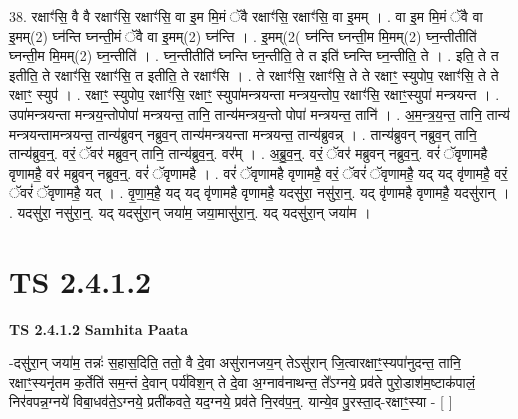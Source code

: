 \documentclass[17pt]{extarticle}
\begin{document}
38. रक्षाꣳ॑सि॒ वै वै रक्षाꣳ॑सि॒ रक्षाꣳ॑सि॒ वा इ॒म मि॒मं ॅवै रक्षाꣳ॑सि॒ रक्षाꣳ॑सि॒ वा इ॒मम् । . वा इ॒म मि॒मं ॅवै वा इ॒मम्(2) घ्न॑न्ति घ्नन्ती॒मं ॅवै वा इ॒मम्(2) घ्न॑न्ति । . इ॒मम्(2( घ्न॑न्ति घ्नन्ती॒म मि॒मम्(2) घ्न॒न्तीतीति॑ घ्नन्ती॒म मि॒मम्(2) घ्न॒न्तीति॑ । . घ्न॒न्तीतीति॑ घ्नन्ति घ्न॒न्तीति॒ ते त इति॑ घ्नन्ति घ्न॒न्तीति॒ ते । . इति॒ ते त इतीति॒ ते रक्षाꣳ॑सि॒ रक्षाꣳ॑सि॒ त इतीति॒ ते रक्षाꣳ॑सि । . ते रक्षाꣳ॑सि॒ रक्षाꣳ॑सि॒ ते ते रक्षाꣳ॒॒ स्युपोप॒ रक्षाꣳ॑सि॒ ते ते रक्षाꣳ॒॒ स्युप॑ । . रक्षाꣳ॒॒ स्युपोप॒ रक्षाꣳ॑सि॒ रक्षाꣳ॒॒ स्युपा॑मन्त्रयन्ता मन्त्रय॒न्तोप॒ रक्षाꣳ॑सि॒ रक्षाꣳ॒॒स्युपा॑ मन्त्रयन्त । . उपा॑मन्त्रयन्ता मन्त्रय॒न्तोपोपा॑ मन्त्रयन्त॒ तानि॒ तान्य॑मन्त्रय॒न्तो पोपा॑ मन्त्रयन्त॒ तानि॑ । . अ॒म॒न्त्र॒य॒न्त॒ तानि॒ तान्य॑ मन्त्रयन्तामन्त्रयन्त॒ तान्य॑ब्रुवन् नब्रुव॒न् तान्य॑मन्त्रयन्ता मन्त्रयन्त॒ तान्य॑ब्रुवन्न् । . तान्य॑ब्रुवन् नब्रुव॒न् तानि॒ तान्य॑ब्रुव॒न्॒. वरं॒ ॅवर॑ मब्रुव॒न् तानि॒ तान्य॑ब्रुव॒न्॒. वर᳚म् । . अ॒ब्रु॒व॒न्॒. वरं॒ ॅवर॑ मब्रुवन् नब्रुव॒न्॒. वरं॑ ॅवृणामहै वृणामहै॒ वर॑ मब्रुवन् नब्रुव॒न्॒. वरं॑ ॅवृणामहै । . वरं॑ ॅवृणामहै वृणामहै॒ वरं॒ ॅवरं॑ ॅवृणामहै॒ यद् यद् वृ॑णामहै॒ वरं॒ ॅवरं॑ ॅवृणामहै॒ यत् । . वृ॒णा॒म॒है॒ यद् यद् वृ॑णामहै वृणामहै॒ यदसु॑रा॒ नसु॑रा॒न्॒. यद् वृ॑णामहै वृणामहै॒ यदसु॑रान् । . यदसु॑रा॒ नसु॑रा॒न्॒. यद् यदसु॑रा॒न् जया॑म॒ जया॒मासु॑रा॒न्॒. यद् यदसु॑रा॒न् जया॑म । \newline
\pagebreak
{}

\section{ TS 2.4.1.2 }

\textbf{TS 2.4.1.2 } \newline
\textbf{Samhita Paata} \newline

-दसु॑रा॒न् जया॑म॒ तन्नः॑ स॒हास॒दिति॒ ततो॒ वै दे॒वा असु॑रानजय॒न् तेऽसु॑रान् जि॒त्वारक्षाꣳ॒॒स्यपा॑नुदन्त॒ तानि॒ रक्षाꣳ॒॒स्यनृ॑तम क॒र्तेति॑ सम॒न्तं दे॒वान् पर्य॑विश॒न् ते दे॒वा अ॒ग्नाव॑नाथन्त॒ ते᳚ऽग्नये॒ प्रव॑ते पुरो॒डाश॑म॒ष्टाक॑पालं॒ निर॑वपन्न॒ग्नये॑ विबा॒धव॑ते॒ऽग्नये॒ प्रती॑कवते॒ यद॒ग्नये॒ प्रव॑ते नि॒रव॑प॒न्॒. यान्ये॒व पु॒रस्ता॒द्-रक्षाꣳ॒॒स्या - [  ] \newline
\end{document}
